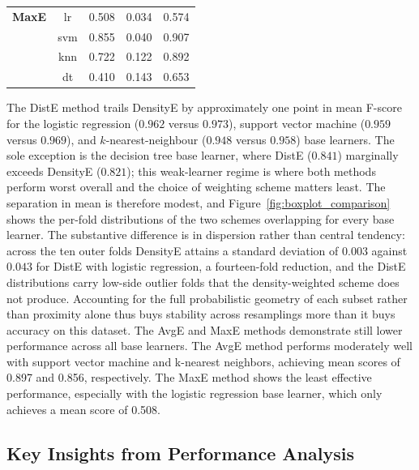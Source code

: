 \documentclass[lettersize,journal]{IEEEtran}
\begin{document}
\begin{table}[htbp]
\begin{center}
\begin{tabular}{|c|c|c|c|c|}
				\hline 
				
				\textbf{MaxE} & lr & 0.508 & 0.034 & 0.574 \\
				
				& svm & 0.855 & 0.040 & 0.907 \\
				
				& knn & 0.722 & 0.122 & 0.892 \\
				
				& dt & 0.410 & 0.143 & 0.653 \\
				
				\hline
				
			\end{tabular}
			
		\end{center}
		
	\end{table}
	
	The DistE method trails DensityE by approximately one point in mean F-score for the logistic
	regression ($0.962$ versus $0.973$), support vector machine ($0.959$ versus $0.969$), and
	$k$-nearest-neighbour ($0.948$ versus $0.958$) base learners. The sole exception is the decision
	tree base learner, where DistE ($0.841$) marginally exceeds DensityE ($0.821$); this weak-learner
	regime is where both methods perform worst overall and the choice of weighting scheme matters
	least. The separation in mean is therefore modest, and Figure~\ref{fig:boxplot_comparison} shows
	the per-fold distributions of the two schemes overlapping for every base learner. The substantive
	difference is in dispersion rather than central tendency: across the ten outer folds DensityE
	attains a standard deviation of $0.003$ against $0.043$ for DistE with logistic regression, a
	fourteen-fold reduction, and the DistE distributions carry low-side outlier folds that the
	density-weighted scheme does not produce. Accounting for the full probabilistic geometry of each
	subset rather than proximity alone thus buys stability across resamplings more than it buys
	accuracy on this dataset. The AvgE and MaxE methods demonstrate still lower performance across all base learners. The
	AvgE method performs moderately well with support vector machine and
	k-nearest neighbors, achieving mean scores of 0.897 and 0.856, respectively.
	The MaxE method shows the least effective performance, especially with the
	logistic regression base learner, which only achieves a mean score of 0.508.
	
	\subsection{Key Insights from Performance Analysis}
	
\end{document}
